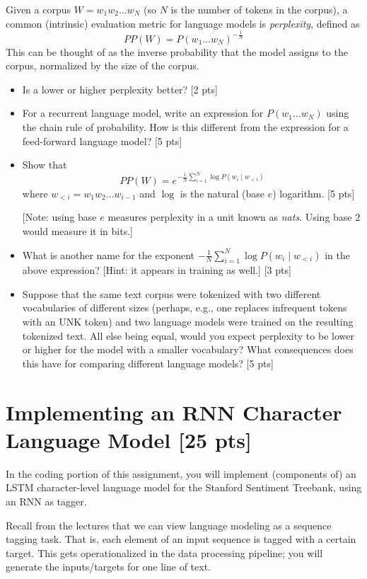 \documentclass[11pt]{article}
\begin{document}
\vspace{2em}
 Given a corpus $W = w_1 w_2 \dots w_N$ (so $N$ is the number of tokens in the corpus), a common (intrinsic) evaluation metric for language models is \emph{perplexity}, defined as
\[ PP(W) = P(w_1 \dots w_N)^{-\frac{1}{N}} \]
This can be thought of as the inverse probability that the model assigns to the corpus, normalized by the size of the corpus.
\begin{itemize}
  \item Is a lower or higher perplexity better? \hfill [2 pts]
  \item For a recurrent language model, write an expression for $P(w_1 \dots w_N)$ using the chain rule of probability.  How is this different from the expression for a feed-forward language model? \hfill [5 pts]
  \item Show that
  \[ PP(W) = e^{-\frac{1}{N} \sum_{i=1}^N \log P(w_i \mid w_{<i})} \]
  where $w_{<i} = w_1 w_2 \dots w_{i-1}$ and $\log$ is the natural (base $e$) logarithm. \hfill [5 pts]
  
  [Note: using base $e$ measures perplexity in a unit known as \emph{nats}.  Using base $2$ would measure it in bits.]

  \item What is another name for the exponent $-\frac{1}{N} \sum_{i=1}^N \log P(w_i \mid w_{<i})$ in the above expression? [Hint: it appears in training as well.] \hfill [3 pts]
  \item Suppose that the same text corpus were tokenized with two different vocabularies of different sizes (perhaps, e.g., one replaces infrequent tokens with an UNK token) and two language models were trained on the resulting tokenized text.  All else being equal, would you expect perplexity to be lower or higher for the model with a smaller vocabulary?  What consequences does this have for comparing different language models? [5 pts]
\end{itemize}


\section{Implementing an RNN Character Language Model [25 pts]}

In the coding portion of this assignment, you will implement (components of) an LSTM character-level language model for the Stanford Sentiment Treebank, using an RNN as tagger.

\vspace{2em}
 Recall from the lectures that we can view language modeling as a sequence tagging task.  That is, each element of an input sequence is tagged with a certain target.  This gets operationalized in the data processing pipeline; you will generate the inputs/targets for one line of text.
\end{document}
